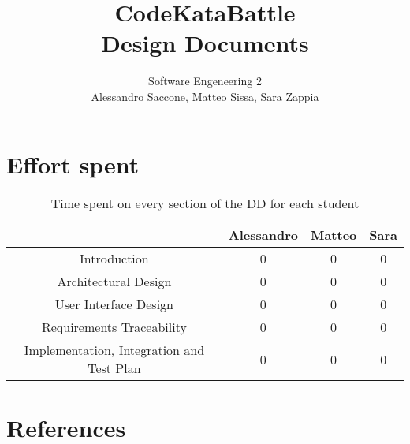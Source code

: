 \documentclass[12pt,a4paper]{article}
\title{CodeKataBattle\\ Design Documents}
\author{Software Engeneering 2\\
       Alessandro Saccone, Matteo Sissa, Sara Zappia}
\begin{document}
\maketitle

\newpage
\tableofcontents











\section{Effort spent}
\begin{table}[h]
  \centering
  \begin{tabular}{|c|c|c|c|}
    \hline
      & Alessandro & Matteo & Sara \\
    \hline
    Introduction & 0 & 0 & 0 \\
    \hline
    Architectural Design & 0 & 0 & 0 \\
    \hline
    User Interface Design & 0 & 0 & 0 \\ 
    \hline
    Requirements Traceability & 0 & 0 & 0  \\
    \hline
    Implementation, Integration and Test Plan & 0 & 0 & 0 \\
    
  \end{tabular}
  \caption{Time spent on every section of the DD for each student}
  \label{tab:effort}
\end{table}

\section{References}
%
%
\end{document}
